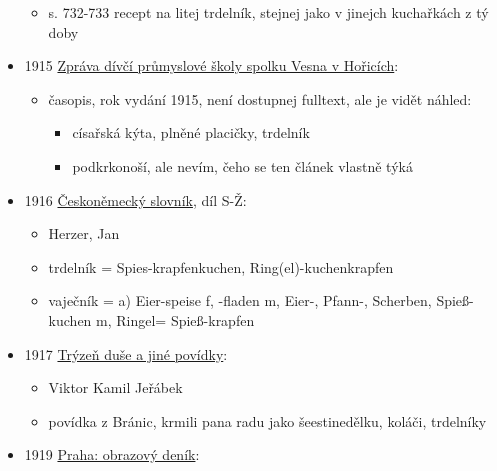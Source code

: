 \begin{itemize}
  \begin{itemize}
  \tightlist
  \item
    s. 732-733 recept na litej trdelník, stejnej jako v jinejch
    kuchařkách z tý doby
  \end{itemize}
\item
  1915
  \href{https://ceskadigitalniknihovna.cz/view/uuid:f679b550-74ec-11ef-b80e-5ef3fc9bb22f?page=uuid:091aa6cd-7fcc-4ef0-99cd-a2a5f9d72724&fulltext=trd*ln*k*&source=nkp}{Zpráva
  dívčí průmyslové školy spolku Vesna v Hořicích}:

  \begin{itemize}
  \tightlist
  \item
    časopis, rok vydání 1915, není dostupnej fulltext, ale je vidět
    náhled:

    \begin{itemize}
    \tightlist
    \item
      císařská kýta, plněné placičky, trdelník
    \item
      podkrkonoší, ale nevím, čeho se ten článek vlastně týká
    \end{itemize}
  \end{itemize}
\item
  1916
  \href{https://ceskadigitalniknihovna.cz/uuid/uuid:57d4bfd0-7b1f-11e3-a80c-005056825209}{Českoněmecký
  slovník}, díl S-Ž:

  \begin{itemize}
  \tightlist
  \item
    Herzer, Jan
  \item
    trdelník = Spies-krapfen\textbar kuchen,
    Ring(el)-kuchen\textbar krapfen
  \item
    vaječník = a) Eier-speise f, -fladen m, Eier-, Pfann-, Scherben,
    Spieß-kuchen m, Ringel= Spieß-krapfen
  \end{itemize}
\item
  1917
  \href{https://ceskadigitalniknihovna.cz/view/uuid:bc7a2eb0-944f-11e6-baa5-005056827e51?page=uuid\%3A1fdf0630-a5f1-11e6-8bf1-001018b5eb5c&fulltext=trdeln\%C3\%ADk\%20OR\%20trdeln\%C3\%ADky\%20OR\%20trdeln\%C3\%ADk\%C5\%AF&source=mzk}{Trýzeň
  duše a jiné povídky}:

  \begin{itemize}
  \tightlist
  \item
    Viktor Kamil Jeřábek
  \item
    povídka z Bránic, krmili pana radu jako šeestinedělku, koláči,
    trdelníky
  \end{itemize}
\item
  1919
  \href{https://ceskadigitalniknihovna.cz/view/uuid:14e7b8a0-0fe2-11ee-8c4d-5ef3fc9bb22f?page=uuid\%3A9b6bf140-0ff9-11ee-b46c-5ef3fcdaa9a7&fulltext=trdeln\%C3\%ADk\%20OR\%20trdeln\%C3\%ADky\%20OR\%20trdeln\%C3\%ADk\%C5\%AF&source=nkp}{Praha:
  obrazový deník}:


\end{itemize}
